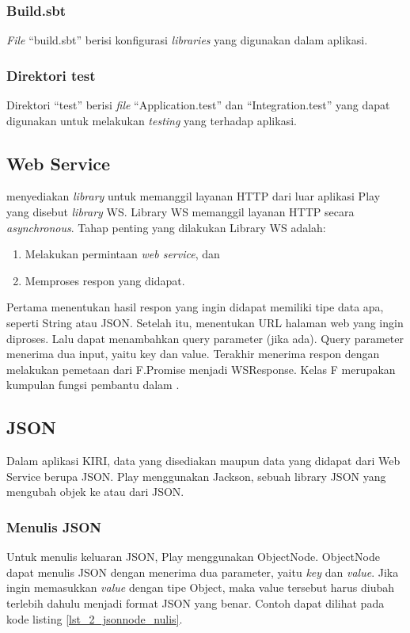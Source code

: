 \subsubsection{Build.sbt}
\textit{File} ``build.sbt'' berisi konfigurasi \textit{libraries} yang digunakan dalam aplikasi.

\subsubsection{Direktori test}
Direktori ``test'' berisi \textit{file} ``Application.test'' dan ``Integration.test'' yang dapat digunakan untuk melakukan \textit{testing} yang terhadap aplikasi.

\subsection{Web Service}
\play menyediakan \textit{library} untuk memanggil layanan HTTP dari luar aplikasi Play yang disebut \textit{library} WS. Library WS memanggil layanan HTTP secara \textit{asynchronous}. Tahap penting yang dilakukan Library WS adalah:
\begin{enumerate}
	\item Melakukan permintaan \textit{web service}, dan
	\item Memproses respon yang didapat.
\end{enumerate}

Pertama menentukan hasil respon yang ingin didapat memiliki tipe data apa, seperti String atau JSON. Setelah itu, menentukan URL halaman web yang ingin diproses. Lalu dapat menambahkan query parameter (jika ada). Query parameter menerima dua input, yaitu key dan value. Terakhir menerima respon dengan melakukan pemetaan dari F.Promise menjadi WSResponse. Kelas F merupakan kumpulan fungsi pembantu dalam \play.

\subsection{JSON}
Dalam aplikasi KIRI, data yang disediakan maupun data yang didapat dari Web Service berupa JSON. Play menggunakan Jackson, sebuah library JSON yang mengubah objek ke atau dari JSON.

\subsubsection{Menulis JSON}
Untuk menulis keluaran JSON, Play menggunakan ObjectNode. ObjectNode dapat menulis JSON dengan menerima dua parameter, yaitu \textit{key} dan \textit{value}. Jika ingin memasukkan \textit{value} dengan tipe Object, maka value tersebut harus diubah terlebih dahulu menjadi format JSON yang benar. Contoh dapat dilihat pada kode listing \ref{lst_2_jsonnode_nulis}.

